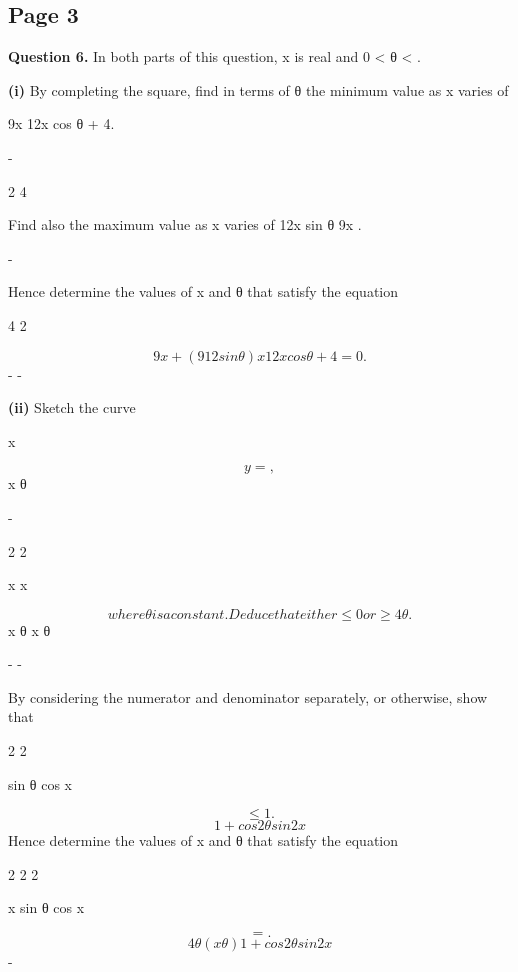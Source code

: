 \documentclass[12pt]{article}
\begin{document}
\subsection*{Page 3}
\begin{flushleft}
\bigskip\textbf{Question 6.} In both parts of this question, x is real and 0 < θ < \pi.\par
\textbf{(i)} By completing the square, find in terms of θ the minimum value as x varies of\par
9x 12x cos θ + 4.\par
-\par
2 4\par
Find also the maximum value as x varies of 12x sin θ 9x .\par
-\par
Hence determine the values of x and θ that satisfy the equation\par
4 2\par
\[9x + (9 12 sin θ)x 12x cos θ + 4 = 0.\]
- -\par
\textbf{(ii)} Sketch the curve\par
x\par
\[y = ,\]
x θ\par
-\par
2 2\par
x x\par
\[where θ is a constant. Deduce that either \leq 0 or \geq 4θ.\]
x θ x θ\par
- -\par
By considering the numerator and denominator separately, or otherwise, show that\par
2 2\par
sin θ cos x\par
\[\leq 1.\]
\[1 + cos2 θ sin 2 x\]
Hence determine the values of x and θ that satisfy the equation\par
2 2 2\par
x sin θ cos x\par
\[= .\]
\[4θ(x θ) 1 + cos2 θ sin 2 x\]
-\par
\end{flushleft}
\end{document}
